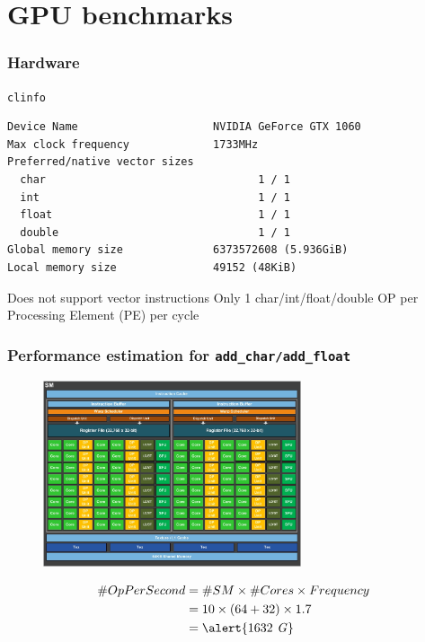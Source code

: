 \section{GPU benchmarks}
\begin{frame}[fragile]
  \frametitle{Hardware}
  \pause{}
  \begin{exampleblock}{\texttt{clinfo}}
\begin{verbatim}
Device Name                     NVIDIA GeForce GTX 1060
Max clock frequency             1733MHz
Preferred/native vector sizes
  char                                 1 / 1
  int                                  1 / 1
  float                                1 / 1
  double                               1 / 1
Global memory size              6373572608 (5.936GiB)
Local memory size               49152 (48KiB)
\end{verbatim}
  \end{exampleblock}
  \pause{}
  \begin{alertblock}{Does not support vector instructions}
    Only \alert{1} char/int/float/double OP per Processing Element
    (PE) per cycle
  \end{alertblock}
\end{frame}

\begin{frame}
  \frametitle{Performance estimation for
    \texttt{add\_char/add\_float}}
  \pause{}
  \begin{figure}[t]
    \centering \includegraphics[height=5.5cm]{sm.png}
  \end{figure}
  \pause{}
  \begin{align*}
    \#OpPerSecond &= \#SM \times \#Cores \times Frequency      \\
                  &= 10 \times (64 + 32) \times 1.7 \\
                  &= \alert{1632~\mathit{G}}
  \end{align*}
\end{frame}

